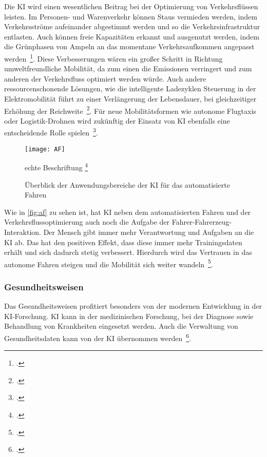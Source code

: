 Die \ac{KI} wird einen wesentlichen Beitrag bei der Optimierung von Verkehrsflüssen leisten. Im Personen- und Warenverkehr können Staus vermieden werden, indem Verkehrsströme aufeinander 
abgestimmt werden und so die Verkehrsinfrastruktur entlasten. Auch können freie Kapazitäten erkannt und ausgenutzt werden, indem die Grünphasen von Ampeln an das momentane
Verkehrsaufkommen angepasst werden~\footcite[\vglf][]{Wittpahl.2018}. Diese Verbesserungen wären ein großer Schritt in Richtung umweltfreundliche Mobilität, da zum einen 
die Emissionen verringert und zum anderen der Verkehrsfluss optimiert werden würde. Auch andere ressourcenschonende Lösungen, wie die intelligente Ladezyklen Steuerung in der Elektromobilität
führt zu einer Verlängerung der Lebensdauer, bei gleichzeitiger Erhöhung der Reichweite~\footcite[\vglf][]{Wittpahl.2018}.
Für neue Mobilitätsformen wie autonome Flugtaxis oder Logistik-Drohnen wird zukünftig der Einsatz von KI ebenfalls eine entscheidende Rolle spielen~\footcite[][]{Wittpahl.2018}.

%
\begin{figure}[H]
    \texttt{[image: AF]} 
    \caption{Überblick der Anwendungsbereiche der KI für das automatisierte Fahren}{echte Beschriftung\footnotemark}
    \footcite[Quelle: ][]{Wittpahl.2018}
    \label{fig:af}
\end{figure}

Wie in \autoref{fig:af} zu sehen ist, hat \ac{KI} neben dem automatisierten Fahren und der Verkehrsflussoptimierung auch noch die Aufgabe der Fahrer-Fahrerzeug-Interaktion. Der Mensch 
gibt immer mehr Verantwortung und Aufgaben an die \ac{KI} ab. Das hat den positiven Effekt, dass diese immer mehr Trainingsdaten erhält und sich dadurch stetig verbessert.
Hierdurch wird das Vertrauen in das autonome Fahren steigen und die Mobilität sich weiter wandeln~\footcite[\vglf][]{Wittpahl.2018}.

\subsubsection{Gesundheitsweisen}

Das Gesundheitsweisen profitiert besonders von der modernen Entwicklung in der \ac{KI}-Forschung. \ac{KI} kann in der medizinischen Forschung, bei der Diagnose sowie Behandlung 
von Krankheiten eingesetzt werden. Auch die Verwaltung von Gesundheitsdaten kann von der \ac{KI} übernommen werden~\footcite[\vglf][]{Robot.2023}.

